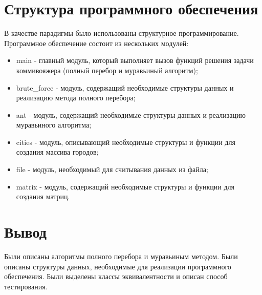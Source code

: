 \section{Структура программного обеспечения}
В качестве парадигмы было использованы структурное программирование. Программное обеспечение состоит из нескольких модулей:
\begin{itemize}
	\item main - главный модуль, который выполняет вызов функций решения задачи коммивояжера (полный перебор и муравьиный алгоритм);
	\item brute\_force - модуль, содержащий необходимые структуры данных и реализацию метода полного перебора;
	\item ant - модуль, содержащий необходимые структуры данных и реализацию муравьиного алгоритма;
	\item cities - модуль, описывающий необходимые структуры и функции для создания массива городов;
	\item file - модуль, необходимый для считывания данных из файла;
	\item matrix - модуль, содержащий необходимые структуры и функции для создания матриц.
\end{itemize}


\section{Вывод}
Были описаны алгоритмы полного перебора и муравьиным методом. Были описаны структуры данных, необходимые для реализации программного обеспечения. Были выделены классы эквивалентности и описан способ тестирования.